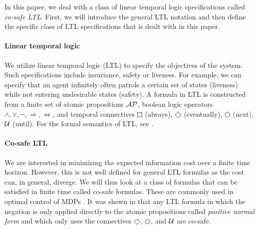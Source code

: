  In this paper, we deal with a class of linear temporal logic specifications called \emph{co-safe LTL}. First, we will introduce the general LTL notation and then define the specific class of LTL specifications that is dealt with in this paper.

\paragraph*{Linear temporal logic} We utilize linear temporal logic (LTL) to specify the objectives of the system. Such specifications include invariance, safety or liveness. For example, we can specify that an agent infinitely often patrols a certain set of states (liveness) while not entering undesirable states (safety). A formula in LTL is constructed from a finite set of atomic propositions $\mathcal{AP}$, boolean logic operators $\wedge,\vee,\lnot,\Rightarrow,\Leftrightarrow$, and temporal connectives $\LTLsquare$ (always), $\LTLdiamond$ (eventually), $\LTLcircle$ (next), $\operatorname{\mathcal{U}}$ (until). For the formal semantics of LTL, see \cite{BaierKatoen08}.

\paragraph*{Co-safe LTL} We are interested in minimizing the expected information cost over a finite time horizon. However, this is not well defined for general LTL formulas as the cost can, in general, diverge. We will thus look at a class of formulas that can be satisfied in finite time called co-safe formulas. These are commonly used in optimal control of MDPs \cite{Lacerda14}. It was shown in \cite{kupferman2001model} that any LTL formula in which the negation is only applied directly to the atomic propositions called \emph{positive normal form} and which only uses the connectives $\LTLdiamond$, $\LTLcircle$, and $\operatorname{\mathcal{U}}$ are co-safe. 

